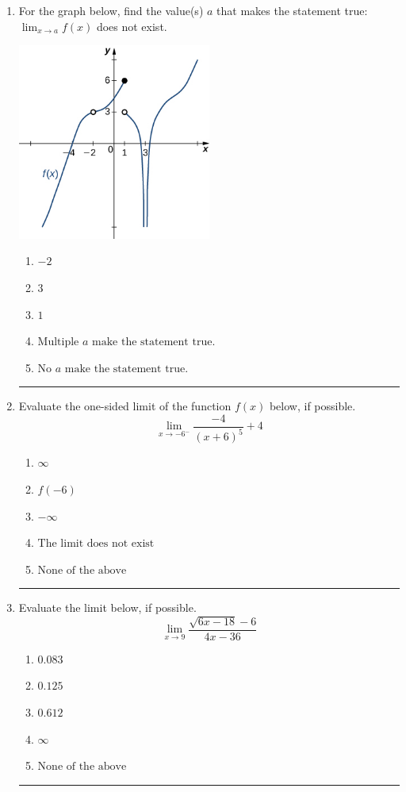 \documentclass[14pt]{extbook}
\newcommand{\litem}[1]{\item#1\hspace*{-1cm}\rule{\textwidth}{0.4pt}}
\begin{document}
\begin{enumerate}
{\begin{enumerate}[label=\Alph*.]
\end{enumerate} }
\litem{
For the graph below, find the value(s) $a$ that makes the statement true: $ \displaystyle \lim_{x \rightarrow a} f(x)$ does not exist.
\begin{center}
    \includegraphics[width=0.5\textwidth]{../Figures/evaluateLimitGraphicallyCopyB.png}
\end{center}
\begin{enumerate}[label=\Alph*.]
\item \( -2 \)
\item \( 3 \)
\item \( 1 \)
\item \( \text{Multiple } a \text{ make the statement true}. \)
\item \( \text{No } a \text{ make the statement true}. \)

\end{enumerate} }
\litem{
Evaluate the one-sided limit of the function $f(x)$ below, if possible.\[ \lim_{x \rightarrow -6^-} \frac{-4}{(x+6)^5}+4 \]\begin{enumerate}[label=\Alph*.]
\item \( \infty \)
\item \( f(-6) \)
\item \( -\infty \)
\item \( \text{The limit does not exist} \)
\item \( \text{None of the above} \)

\end{enumerate} }
\litem{
Evaluate the limit below, if possible.\[ \lim_{x \rightarrow 9} \frac{\sqrt{6x - 18} - 6}{4x - 36} \]\begin{enumerate}[label=\Alph*.]
\item \( 0.083 \)
\item \( 0.125 \)
\item \( 0.612 \)
\item \( \infty \)
\item \( \text{None of the above} \)


\end{enumerate}}
\end{enumerate}
\end{document}
